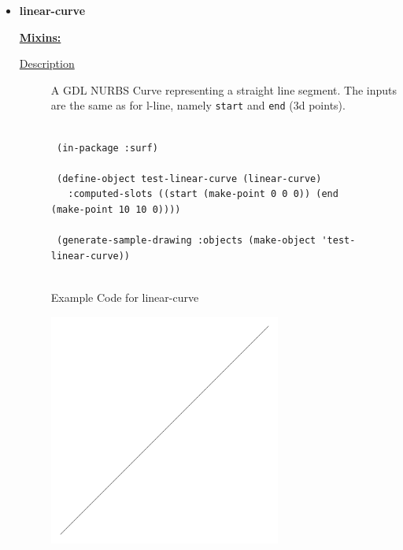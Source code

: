 \documentclass [11pt]{book}
\begin{document}
\begin{itemize}
\item {}
\label{prim:linear-curve}
\textbf{linear-curve}


\textbf{
\underline{Mixins:}} %





\begin{description}

\item [
\underline{Description}]


A GDL NURBS Curve representing a straight line segment. The inputs are the same as
for l-line, namely \texttt{start} and \texttt{end} (3d points).



\end{description}




\begin{figure}
\begin{lrbox}{\boxedverb}
\begin{minipage}{\linewidth}
{\small

\begin{verbatim}

 (in-package :surf)

 (define-object test-linear-curve (linear-curve)
   :computed-slots ((start (make-point 0 0 0)) (end (make-point 10 10 0))))
  
 (generate-sample-drawing :objects (make-object 'test-linear-curve))


\end{verbatim}}
\end{minipage}
\end{lrbox}
\fbox{\usebox{\boxedverb}}

\caption{Example Code for linear-curve}

\label{fig:example-code-linear-curve}

\end{figure}

\begin{figure}
\begin{center}
\includegraphics[width=3in,height=3in]{../images/example-linear-curve.pdf}
\end{center}


\end{figure}
\end{itemize}
\end{document}
